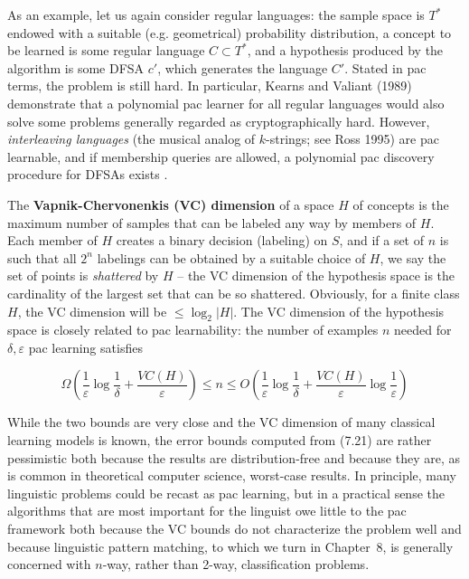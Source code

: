 As an example, let us again consider regular languages: the sample space is
$T^*$ endowed with a suitable (e.g. geometrical) probability distribution, a
concept to be learned is some regular language $C \subset T^*$, and a
hypothesis produced by the algorithm is some DFSA $c'$, which generates the
language $C'$. Stated in pac terms, the problem is still hard. In particular,
Kearns and Valiant (1989)\nocite{Kearns:1989} demonstrate that a polynomial
pac learner for all regular languages would also solve some problems generally
regarded as cryptographically hard. However, {\it interleaving languages} (the
musical analog of $k$-strings; see Ross 1995)\nocite{Ross:1995} are pac
learnable, and if membership queries are allowed, a polynomial pac discovery
procedure for DFSAs exists \cite{Angluin:1987}.

The {\bf Vapnik-Chervonenkis (VC) dimension} of a space $H$ of concepts is the maximum number of samples that
can be labeled any way by members of $H$. Each member of $H$ creates a binary
decision (labeling) on $S$, and if a set of $n$ is such that all $2^n$
labelings can be obtained by a suitable choice of $H$, we say the set of
points is {\it shattered} by $H$ -- the VC dimension of the hypothesis space
is the cardinality of the largest set that can be so shattered. Obviously, for
a finite class $H$, the VC dimension will be $\leq \log_2 |H|$. The VC
dimension of the hypothesis space is closely related to pac learnability: the
number of examples $n$ needed for $\delta,\varepsilon$ pac learning satisfies

\begin{equation}
\Omega\left(\frac{1}{\varepsilon}\log\frac{1}{\delta}+\frac{VC(H)}{\varepsilon}\right)
\leq n \leq O\left(\frac{1}{\varepsilon}\log\frac{1}{\delta}
+\frac{VC(H)}{\varepsilon}\log\frac{1}{\varepsilon}\right)
\end{equation}

\smallskip\noindent While the two bounds are very close and the VC dimension
of many classical learning models is known, the error bounds computed from
(7.21) are rather pessimistic both because the results are distribution-free
and because they are, as is common in theoretical computer science, worst-case
results.  In principle, many linguistic problems could be recast as pac
learning, but in a practical sense the algorithms that are most important for
the linguist owe little to the pac framework both because the VC bounds do
not characterize the problem well and because linguistic pattern matching, to
which we turn in Chapter~8, is generally concerned with $n$-way, rather than
2-way, classification problems.

